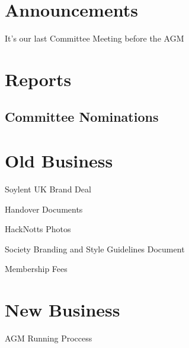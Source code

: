 \documentclass[11pt,hacksoc,agenda]{meetingmins}
\begin{document}
\maketitle

\section{Announcements}
\begin{items}
	\item
	It's our last Committee Meeting before the AGM
	
\end{items}

\section{Reports}

\subsection{Committee Nominations}
\begin{hiddensubitems}
\item
\end{hiddensubitems}

\section{Old Business}
\begin{items}
	\item
	Soylent UK Brand Deal

	\item
	Handover Documents
	
	\item
	HackNotts Photos
	
	\item
	Society Branding and Style Guidelines Document
	
	\item
	Membership Fees
\end{items}

\section{New Business}
\begin{items}
	\item
	AGM Running Proccess
\end{items}

\vspace{1em}
\nextmeeting{}
\end{document}
